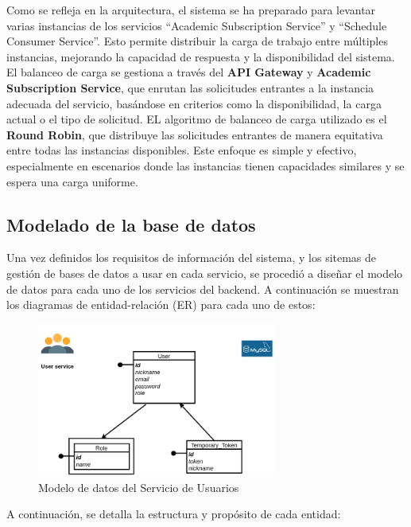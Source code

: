Como se refleja en la arquitectura, el sistema se ha preparado para levantar varias instancias de los servicios ``Academic Subscription Service'' y ``Schedule Consumer Service''. Esto permite distribuir la carga de trabajo entre múltiples instancias, mejorando la capacidad de respuesta y la disponibilidad del sistema. El balanceo de carga se gestiona a través del \textbf{API Gateway} y \textbf{Academic Subscription Service}, que enrutan las solicitudes entrantes a la instancia adecuada del servicio, basándose en criterios como la disponibilidad, la carga actual o el tipo de solicitud.
\newline\newline
EL algoritmo de balanceo de carga utilizado es el \textbf{Round Robin}, que distribuye las solicitudes entrantes de manera equitativa entre todas las instancias disponibles. Este enfoque es simple y efectivo, especialmente en escenarios donde las instancias tienen capacidades similares y se espera una carga uniforme.

\subsection{Modelado de la base de datos}

Una vez definidos los requisitos de información del sistema, y los sitemas de gestión de bases de datos a usar en cada servicio, se procedió a diseñar el modelo de datos para cada uno de los servicios del backend. A continuación se muestran los diagramas de entidad-relación (ER) para cada uno de estos:

\begin{figure}[H]
    \centering
    \includegraphics[width=0.7\textwidth]{figures/06_user_db.png}
    \caption{Modelo de datos del Servicio de Usuarios}
    \label{fig:user_service_er}
\end{figure}

A continuación, se detalla la estructura y propósito de cada entidad:

